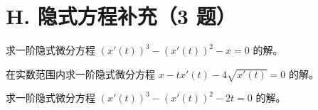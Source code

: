\section{H. 隐式方程补充（3 题）}
\noindent\begin{minipage}{\linewidth}
求一阶隐式微分方程 $(x'(t))^3-(x'(t))^2-x=0$ 的解。
\end{minipage}\par\vspace{5pt}
\noindent\begin{minipage}{\linewidth}
在实数范围内求一阶隐式微分方程 $x-tx'(t)-4\sqrt{x'(t)}=0$ 的解。
\end{minipage}\par\vspace{5pt}
\noindent\begin{minipage}{\linewidth}
求一阶隐式微分方程 $(x'(t))^3-(x'(t))^2-2t=0$ 的解。
\end{minipage}\par\vspace{5pt}
